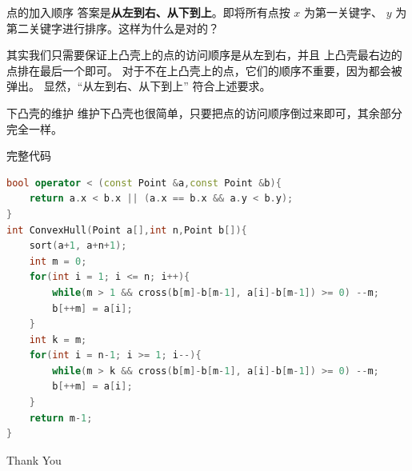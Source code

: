 \documentclass{beamer}
\begin{document}
\begin{frame}[fragile]{点的加入顺序}
    \small
    答案是\textbf{从左到右、从下到上}。即将所有点按 $x$ 为第一关键字、
    $y$ 为第二关键字进行排序。这样为什么是对的？
    \vspace{1em}\pause

    其实我们只需要保证上凸壳上的点的访问顺序是从左到右，并且
    上凸壳最右边的点排在最后一个即可。
    对于不在上凸壳上的点，它们的顺序不重要，因为都会被弹出。
    显然，“从左到右、从下到上” 符合上述要求。
\end{frame}

\begin{frame}[fragile]{下凸壳的维护}
    \small
    维护下凸壳也很简单，只要把点的访问顺序倒过来即可，其余部分完全一样。
\end{frame}

\begin{frame}[fragile]{完整代码}
    \small
    \begin{lstlisting}[language=c++]
bool operator < (const Point &a,const Point &b){
    return a.x < b.x || (a.x == b.x && a.y < b.y);
}
int ConvexHull(Point a[],int n,Point b[]){
    sort(a+1, a+n+1);
    int m = 0;
    for(int i = 1; i <= n; i++){
        while(m > 1 && cross(b[m]-b[m-1], a[i]-b[m-1]) >= 0) --m;
        b[++m] = a[i];
    }
    int k = m;
    for(int i = n-1; i >= 1; i--){
        while(m > k && cross(b[m]-b[m-1], a[i]-b[m-1]) >= 0) --m;
        b[++m] = a[i];
    }
    return m-1;
}
    \end{lstlisting}
\end{frame}

\begin{frame}
    \begin{center}
        {\Huge\calligra Thank You}
    \end{center}
\end{frame}
\end{document}
